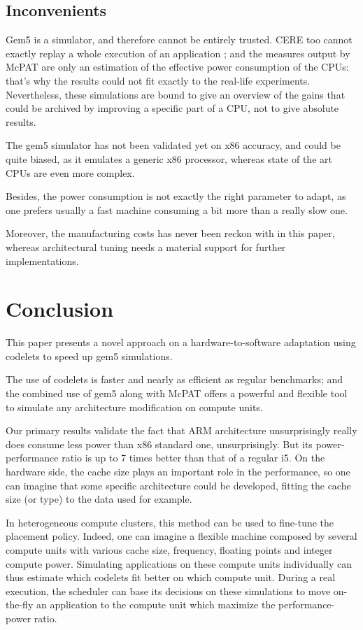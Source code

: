 \documentclass{article}
\begin{document}
\begin{multicols}{2}
\subsection{Inconvenients}
Gem5 is a simulator, and therefore cannot be entirely trusted. CERE too cannot exactly replay a whole execution of an application ; and the measures output by McPAT are only an estimation of the effective power consumption of the CPUs: that's why the results could not fit exactly to the real-life experiments. Nevertheless, these simulations are bound to give an overview of the gains that could be archived by improving a specific part of a CPU, not to give absolute results.

The gem5 simulator has not been validated yet on x86 accuracy, and could be quite biased, as it emulates a generic x86 processor, whereas state of the art CPUs are even more complex.

Besides, the power consumption is not exactly the right parameter to adapt, as one prefers usually a fast machine consuming a bit more than a really slow one.

Moreover, the manufacturing costs has never been reckon with in this paper, whereas architectural tuning needs a material support for further implementations. 


\section{Conclusion}
\label{ccl}
This paper presents a novel approach on a hardware-to-software adaptation using codelets to speed up gem5 simulations. 

The use of codelets is faster and nearly as efficient as regular benchmarks; and the combined use of gem5 along with McPAT offers a powerful and flexible tool to simulate any architecture modification on compute units.

Our primary results validate the fact that ARM architecture unsurprisingly really does consume less power than x86 standard one, unsurprisingly. But its power-performance ratio is up to 7 times better than that of a regular i5. On the hardware side, the cache size plays an important role in the performance, so one can imagine that some specific architecture could be developed, fitting the cache size (or type) to the data used for example.

In heterogeneous compute clusters, this method can be used to fine-tune the placement policy. Indeed, one can imagine a flexible machine composed by several compute units with various cache size, frequency, floating points and integer compute power. Simulating applications on these compute units individually can thus estimate which codelets fit better on which compute unit. During a real execution, the scheduler can base its decisions on these simulations to move on-the-fly an application to the compute unit which maximize the performance-power ratio.



\end{multicols}
\end{document}
